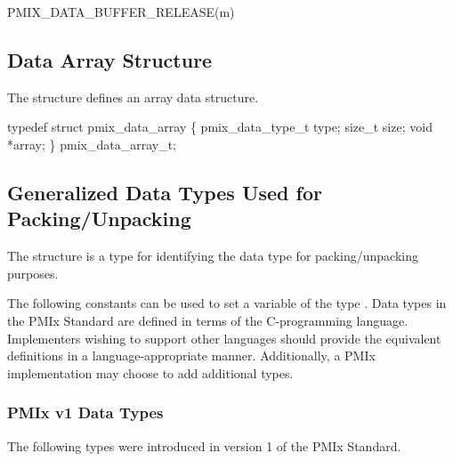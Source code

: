 \cspecificstart
\begin{codepar}
PMIX_DATA_BUFFER_RELEASE(m)
\end{codepar}
\cspecificend

\begin{arglist}
\end{arglist}


\subsection{Data Array Structure}

The  structure defines an array data structure.

\cspecificstart
\begin{codepar}
typedef struct pmix_data_array \{
    pmix_data_type_t type;
    size_t size;
    void *array;
\} pmix_data_array_t;
\end{codepar}
\cspecificend



\subsection{Generalized Data Types Used for Packing/Unpacking}

The  structure is a  type for identifying the data type for packing/unpacking purposes.

\adviceimplstart
The following constants can be used to set a variable of the type . Data types in the \ac{PMIx} Standard are defined in terms of the C-programming language. Implementers wishing to support other languages should provide the equivalent definitions in a language-appropriate manner. Additionally, a PMIx implementation may choose to add additional types.
\adviceimplend

\subsubsection{PMIx v1 Data Types}
The following types were introduced in version 1 of the \ac{PMIx} Standard.

